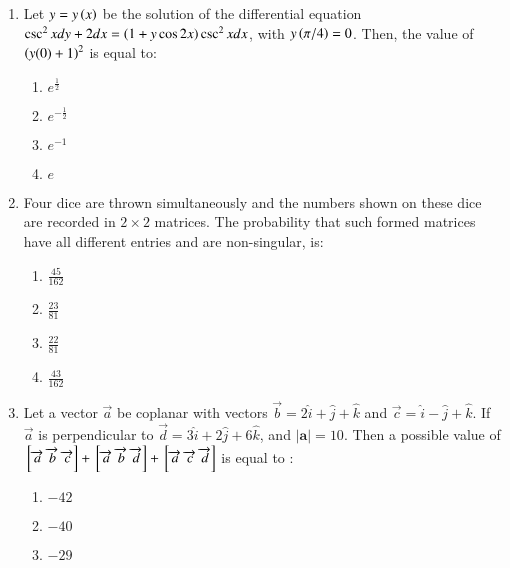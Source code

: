 \documentclass[journal]{IEEEtran}
\begin{document}
\begin{enumerate}
{\begin{multicols}{4}
\begin{enumerate}
\item $\brak{0,2}$
\item $\brak{-1,\frac{3}{2}}$
\item $\brak{-3,-1}$
\end{enumerate}
\end{multicols}
}
\item{
Let $y=y\left(x\right)$ be the solution of the differential equation $\csc^2x dy + 2dx = \left(1+y \cos 2x\right) \csc^2x dx$, with $y\left(\pi/4\right) = 0$. Then, the value of $\left(y(0)+1\right)^2$ is equal to:
\begin{multicols}{4}
\begin{enumerate}
\item $e^\frac{1}{2}$
\item $e^{-\frac{1}{2}}$
\item $e^{-1}$
\item $e$
\end{enumerate}
\end{multicols}
}
\item{
Four dice are thrown simultaneously and the numbers shown on these dice are recorded in $2\times 2$
matrices. The probability that such formed matrices have all different entries and are non-singular, is:
\begin{multicols}{4}
\begin{enumerate}
\item $\frac{45}{162}$
\item $\frac{23}{81}$
\item $\frac{22}{81}$
\item $\frac{43}{162}$
\end{enumerate}
\end{multicols}
}
\item{
Let a vector $\overrightarrow{a}$ be coplanar with vectors $\overrightarrow{b} = 2\hat{i} + \hat{j}  + \hat{k} $ and $\overrightarrow{c} = \hat{i}  - \hat{j}  + \hat{k} $. If $\overrightarrow{a}$ is perpendicular to $\overrightarrow{d} = 3\hat{i} + 2\hat{j} + 6\hat{k}$, and $|\textbf{a}| = 10$. Then a possible value of ${}\left[\overrightarrow{a}\text{ }\overrightarrow{b}\text{ }\overrightarrow{c}\right]+{}\left[\overrightarrow{a}\text{ }\overrightarrow{b}\text{ }\overrightarrow{d}\right]+{}\left[\overrightarrow{a}\text{ }\overrightarrow{c}\text{ }\overrightarrow{d}\right] $ is equal to :
\begin{multicols}{4}
\begin{enumerate}
\item $-42$
\item $-40$
\item $-29$

\end{enumerate}
\end{multicols}}
\end{enumerate}
\end{document}

